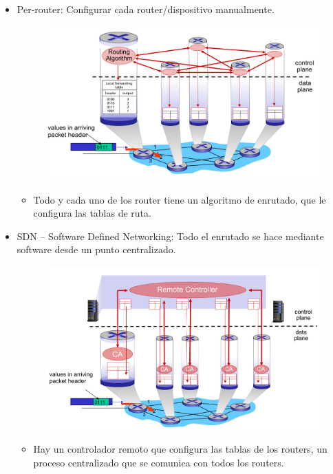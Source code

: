 \documentclass[12pt, twoside, openright]{report} %
\begin{document}
    \begin{itemize}
		\item
		Per-router: Configurar cada router/dispositivo manualmente.
		\begin{figure}[H]
			{\includegraphics[scale=.3]{Untitled 20.png}}
		\end{figure}
		\begin{itemize}
		\item
			Todo y cada uno de los router tiene un algoritmo de enrutado,
			que le configura las tablas de ruta.
		\end{itemize}
		\pagebreak
		\item
		SDN -- Software Defined Networking: Todo el enrutado se hace
		mediante software desde un punto centralizado.
		\begin{figure}[H]
			{\includegraphics[scale=.3]{Untitled 21.png}}
		\end{figure}
		\begin{itemize}
		\item
			Hay un controlador remoto que configura las tablas de los
			routers, un proceso centralizado que se comunica con todos los
			routers.
		\end{itemize}
    \end{itemize}
\end{document}
